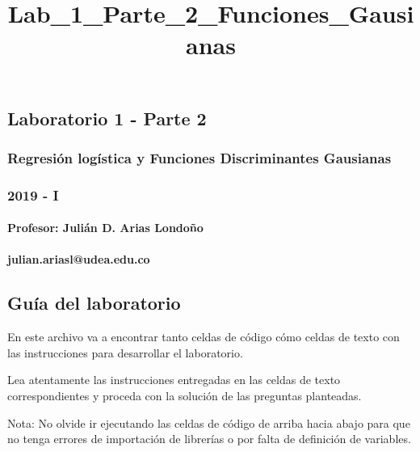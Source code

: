 \documentclass[11pt]{article}
\title{Lab\_1\_Parte\_2\_Funciones\_Gausianas}
\begin{document}
    
    
    \maketitle
    
    

    
    \subsection{Laboratorio 1 - Parte 2}\label{laboratorio-1---parte-2}

\subsubsection{Regresión logística y Funciones Discriminantes
Gausianas}\label{regresiuxf3n-loguxedstica-y-funciones-discriminantes-gausianas}

\subsubsection{2019 - I}\label{i}

\paragraph{Profesor: Julián D. Arias
Londoño}\label{profesor-juliuxe1n-d.-arias-londouxf1o}

\paragraph{julian.ariasl@udea.edu.co}\label{julian.ariasludea.edu.co}

    \subsection{Guía del laboratorio}\label{guuxeda-del-laboratorio}

En este archivo va a encontrar tanto celdas de código cómo celdas de
texto con las instrucciones para desarrollar el laboratorio.

Lea atentamente las instrucciones entregadas en las celdas de texto
correspondientes y proceda con la solución de las preguntas planteadas.

Nota: No olvide ir ejecutando las celdas de código de arriba hacia abajo
para que no tenga errores de importación de librerías o por falta de
definición de variables.
\end{document}
